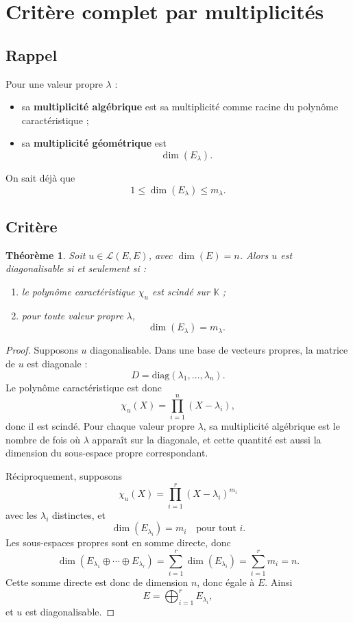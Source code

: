 \documentclass[11pt,a4paper]{article}
\newtheorem{theoreme}[definition]{Théorème}
\theoremstyle{remark}
\newcommand{\K}{\mathbb{K}}
\newcommand{\diag}{\mathrm{diag}}
\newcommand{\chil}{\chi_u}
\begin{document}
\section{Critère complet par multiplicités}

\subsection{Rappel}

Pour une valeur propre \(\lambda\) :
\begin{itemize}
    \item sa \textbf{multiplicité algébrique} est sa multiplicité comme racine du polynôme caractéristique ;
    \item sa \textbf{multiplicité géométrique} est
    \[
    \dim(E_\lambda).
    \]
\end{itemize}

On sait déjà que
\[
1\le \dim(E_\lambda)\le m_\lambda.
\]

\subsection{Critère}

\begin{theoreme}
Soit \(u\in\mathcal L(E,E)\), avec \(\dim(E)=n\). Alors \(u\) est diagonalisable si et seulement si :
\begin{enumerate}[label=\arabic*)]
    \item le polynôme caractéristique \(\chil\) est scindé sur \(\K\) ;
    \item pour toute valeur propre \(\lambda\),
    \[
    \dim(E_\lambda)=m_\lambda.
    \]
\end{enumerate}
\end{theoreme}

\begin{proof}
Supposons \(u\) diagonalisable. Dans une base de vecteurs propres, la matrice de \(u\) est diagonale :
\[
D=\diag(\lambda_1,\dots,\lambda_n).
\]
Le polynôme caractéristique est donc
\[
\chil(X)=\prod_{i=1}^n (X-\lambda_i),
\]
donc il est scindé. Pour chaque valeur propre \(\lambda\), sa multiplicité algébrique est le nombre de fois où \(\lambda\) apparaît sur la diagonale, et cette quantité est aussi la dimension du sous-espace propre correspondant.

Réciproquement, supposons
\[
\chil(X)=\prod_{i=1}^r (X-\lambda_i)^{m_i}
\]
avec les \(\lambda_i\) distinctes, et
\[
\dim(E_{\lambda_i})=m_i
\quad \text{pour tout } i.
\]
Les sous-espaces propres sont en somme directe, donc
\[
\dim\left(E_{\lambda_1}\oplus\cdots\oplus E_{\lambda_r}\right)
=
\sum_{i=1}^r \dim(E_{\lambda_i})
=
\sum_{i=1}^r m_i
=
n.
\]
Cette somme directe est donc de dimension \(n\), donc égale à \(E\). Ainsi
\[
E=\bigoplus_{i=1}^r E_{\lambda_i},
\]
et \(u\) est diagonalisable.
\end{proof}
\end{document}
